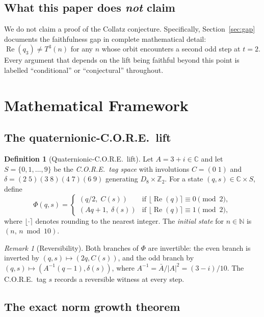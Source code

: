 \documentclass[12pt,reqno]{amsart}
\theoremstyle{plain}
\theoremstyle{definition}
\newtheorem{definition}[theorem]{Definition}
\theoremstyle{remark}
\newtheorem{remark}[theorem]{Remark}
\newcommand{\CC}{\mathbb{C}}
\newcommand{\ZZ}{\mathbb{Z}}
\newcommand{\NN}{\mathbb{N}}
\begin{document}
\subsection{What this paper does \emph{not} claim}
We do not claim a proof of the Collatz conjecture.  Specifically,
Section~\ref{sec:gap} documents the faithfulness gap in complete mathematical
detail: $\operatorname{Re}(q_3) \neq T^3(n)$ for any $n$ whose orbit
encounters a second odd step at $t = 2$.  Every argument that depends
on the lift being faithful beyond this point is labelled ``conditional''
or ``conjectural'' throughout.

\section{Mathematical Framework}
\label{sec:framework}

\subsection{The quaternionic-C.O.R.E.\ lift}

\begin{definition}[Quaternionic-C.O.R.E.\ lift]
\label{def:lift}
Let $A = 3 + i \in \CC$ and let $S = \{0,1,\ldots,9\}$ be the
\emph{C.O.R.E.\ tag space} with involutions $C = (0\;1)$ and
$\delta = (2\;5)(3\;8)(4\;7)(6\;9)$ generating $D_8 \times \ZZ_2$.
For a state $(q,s) \in \CC \times S$, define
\[
  \Phi(q,s) =
  \begin{cases}
    (q/2,\; C(s)) & \text{if } \lfloor\operatorname{Re}(q)\rceil \equiv 0 \pmod{2},\\
    (Aq + 1,\; \delta(s)) & \text{if } \lfloor\operatorname{Re}(q)\rceil \equiv 1 \pmod{2},
  \end{cases}
\]
where $\lfloor\cdot\rceil$ denotes rounding to the nearest integer.
The \emph{initial state} for $n \in \NN$ is $(n,\, n \bmod 10)$.
\end{definition}

\begin{remark}[Reversibility]
Both branches of $\Phi$ are invertible: the even branch is inverted
by $(q,s) \mapsto (2q, C(s))$, and the odd branch by
$(q,s) \mapsto (A^{-1}(q-1), \delta(s))$, where
$A^{-1} = \bar{A}/|A|^2 = (3-i)/10$.  The C.O.R.E.\ tag $s$ records
a reversible witness at every step.
\end{remark}

\subsection{The exact norm growth theorem}
\end{document}
